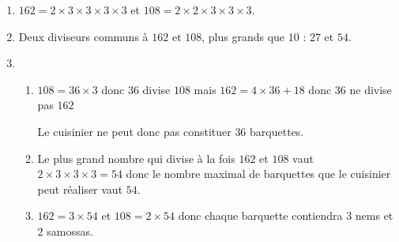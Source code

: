     \begin{enumerate}
        \item $162=2\times 3\times 3\times 3\times 3$ et $108 = 2\times 2\times 3\times 3\times 3$.
        \item Deux diviseurs communs à $162$ et $108$, plus grands que $10$ : $27$ et $54$.
        \item
        \begin{enumerate}
            \item $108 = 36\times 3$ donc $36$ divise $108$ mais $162 = 4\times 36 + 18$ donc $36$ ne divise pas $162$

            Le cuisinier ne peut donc pas constituer $36$ barquettes.
            \item Le plus grand nombre qui divise à la fois $162$ et $108$ vaut $2\times 3\times 3\times 3 = 54$ donc le nombre maximal de barquettes
            que le cuisinier peut réaliser vaut $54$.
            \item $162 = 3\times 54$ et $108 = 2\times 54$ donc chaque barquette contiendra $3$ nems et $2$ samossas.
        \end{enumerate}
    \end{enumerate}
